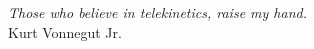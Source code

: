 \begin{epigrafe}
  \vspace*{\fill}
  \begin{flushright}
    \textit
    {
      Those who believe in telekinetics, raise my hand. \\
    }\medskip %
    Kurt Vonnegut Jr.
  \end{flushright}
\end{epigrafe}
\newpage